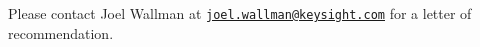 \documentclass[12pt]{article}
\begin{document}
\noindent
Please contact Joel Wallman at \href{mailto:joel.wallman@keysight.com}{\texttt{joel.wallman@keysight.com}} for a letter of recommendation.
\end{document}
